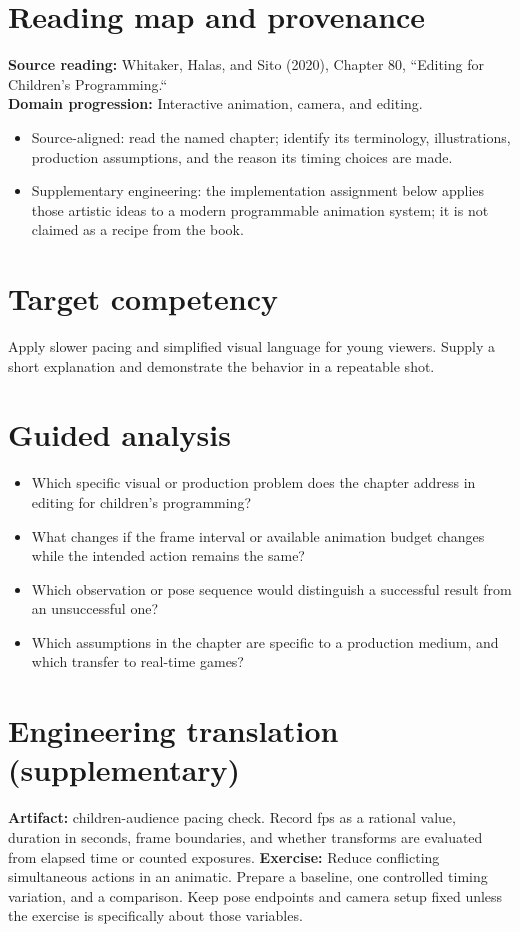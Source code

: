 \documentclass[10pt,letterpaper]{article}
\begin{document}
\makedoctitle
\makedocsummary

\section{Reading map and provenance}
\textbf{Source reading:} Whitaker, Halas, and Sito (2020), Chapter 80, ``Editing for Children’s Programming.``\\
\textbf{Domain progression:} Interactive animation, camera, and editing.
\begin{itemize}
\item Source-aligned: read the named chapter; identify its terminology, illustrations, production assumptions, and the reason its timing choices are made.
\item Supplementary engineering: the implementation assignment below applies those artistic ideas to a modern programmable animation system; it is not claimed as a recipe from the book.
\end{itemize}
\section{Target competency}
Apply slower pacing and simplified visual language for young viewers. Supply a short explanation and demonstrate the behavior in a repeatable shot.
\section{Guided analysis}
\begin{itemize}
\item Which specific visual or production problem does the chapter address in editing for children’s programming?
\item What changes if the frame interval or available animation budget changes while the intended action remains the same?
\item Which observation or pose sequence would distinguish a successful result from an unsuccessful one?
\item Which assumptions in the chapter are specific to a production medium, and which transfer to real-time games?
\end{itemize}
\section{Engineering translation (supplementary)}
\textbf{Artifact:} children-audience pacing check. Record fps as a rational value, duration in seconds, frame boundaries, and whether transforms are evaluated from elapsed time or counted exposures.
\textbf{Exercise:} Reduce conflicting simultaneous actions in an animatic. Prepare a baseline, one controlled timing variation, and a comparison. Keep pose endpoints and camera setup fixed unless the exercise is specifically about those variables.
\end{document}
